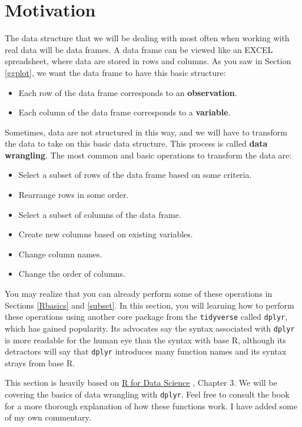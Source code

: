 \documentclass[
]{book}
\providecommand{\tightlist}{%
  \setlength{\itemsep}{0pt}\setlength{\parskip}{0pt}}
\theoremstyle{definition}
\theoremstyle{definition}
\theoremstyle{definition}
\theoremstyle{definition}
\theoremstyle{remark}
\begin{document}
\hypertarget{motivation-4}{%
\section{Motivation}\label{motivation-4}}

The data structure that we will be dealing with most often when working with real data will be data frames. A data frame can be viewed like an EXCEL spreadsheet, where data are stored in rows and columns. As you saw in Section \ref{ggplot}, we want the data frame to have this basic structure:

\begin{itemize}
\tightlist
\item
  Each row of the data frame corresponds to an \textbf{observation}.
\item
  Each column of the data frame corresponds to a \textbf{variable}.
\end{itemize}

Sometimes, data are not structured in this way, and we will have to transform the data to take on this basic data structure. This process is called \textbf{data wrangling}. The most common and basic operations to transform the data are:

\begin{itemize}
\tightlist
\item
  Select a subset of rows of the data frame based on some criteria.
\item
  Rearrange rows in some order.
\item
  Select a subset of columns of the data frame.
\item
  Create new columns based on existing variables.
\item
  Change column names.
\item
  Change the order of columns.
\end{itemize}

You may realize that you can already perform some of these operations in Sections \ref{Rbasics} and \ref{subset}. In this section, you will learning how to perform these operations using another core package from the \texttt{tidyverse} called \texttt{dplyr}, which has gained popularity. Its advocates say the syntax associated with \texttt{dplyr} is more readable for the human eye than the syntax with base R, although its detractors will say that \texttt{dplyr} introduces many function names and its syntax strays from base R.

This section is heavily based on \href{https://r4ds.hadley.nz/}{R for Data Science} \citep{wickham2023}, Chapter 3. We will be covering the basics of data wrangling with \texttt{dplyr}. Feel free to consult the book for a more thorough explanation of how these functions work. I have added some of my own commentary.
\end{document}
